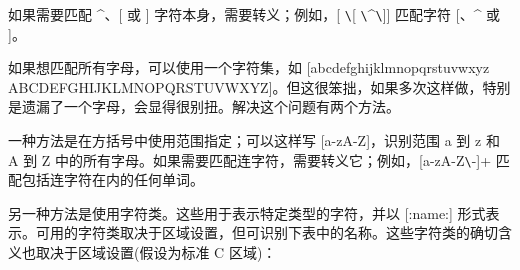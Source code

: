 如果需要匹配 \^{}、[ 或 ] 字符本身，需要转义；例如，[ \verb|\|[ \verb|\|\^{}\verb|\|]] 匹配字符 [、\^{} 或 ]。

如果想匹配所有字母，可以使用一个字符集，如 [abcdefghijklmnopqrstuvwxyz ABCDEFGHIJKLMNOPQRSTUVWXYZ]。但这很笨拙，如果多次这样做，特别是遗漏了一个字母，会显得很别扭。解决这个问题有两个方法。

一种方法是在方括号中使用范围指定；可以这样写 [a-zA-Z]，识别范围 a 到 z 和 A 到 Z 中的所有字母。如果需要匹配连字符，需要转义它；例如，[a-zA-Z\verb|\|-]+ 匹配包括连字符在内的任何单词。

另一种方法是使用字符类。这些用于表示特定类型的字符，并以 [:name:] 形式表示。可用的字符类取决于区域设置，但可识别下表中的名称。这些字符类的确切含义也取决于区域设置(假设为标准 C 区域)：


